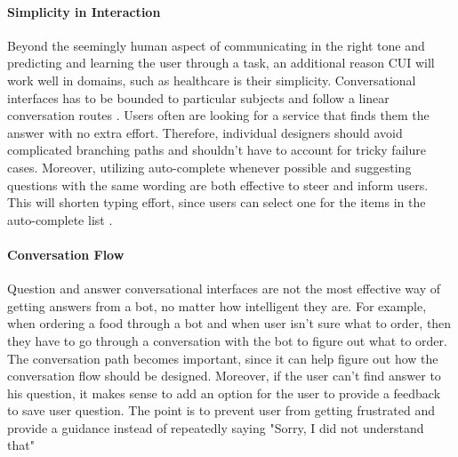 \paragraph{Simplicity in Interaction}
Beyond the seemingly human aspect of communicating in the right tone and predicting and learning the user through a task, an additional reason CUI will work well in domains, such as healthcare is their simplicity. Conversational interfaces has to be bounded to particular subjects and follow a linear conversation routes \cite{bers1998}. Users often are looking for a service that finds them the answer with no extra effort. Therefore, individual designers should avoid complicated branching paths and shouldn't have to account for tricky failure cases. Moreover, utilizing auto-complete whenever possible and suggesting questions with the same wording are both effective to steer and inform users. This will shorten typing effort, since users can select one for the items in the auto-complete list \cite{khan2018}.

\paragraph{Conversation Flow}
Question and answer conversational interfaces are not the most effective way of getting answers from a bot, no matter how intelligent they are. For example, when ordering a food through a bot and when user isn't sure what to order, then they have to go through a conversation with the bot to figure out what to order. The conversation path becomes important, since it can help figure out how the conversation flow should be designed. Moreover, if the user can’t find answer to his question, it makes sense to add an option for the user to provide a feedback to save user question. The point is to prevent user from getting frustrated and provide a guidance instead of repeatedly saying "Sorry, I did not understand that"

